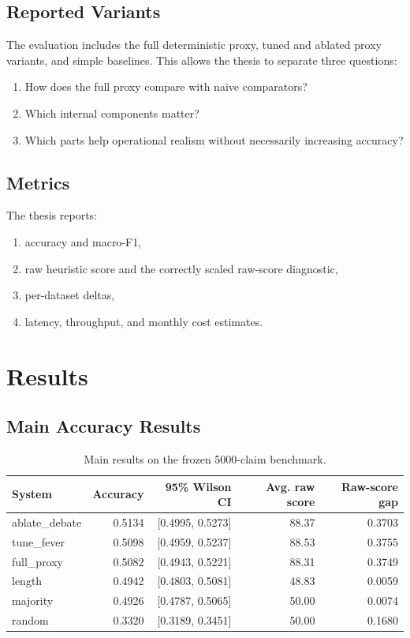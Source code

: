 \documentclass[12pt,a4paper,openright]{report}
\begin{document}
\section{Reported Variants}

The evaluation includes the full deterministic proxy, tuned and ablated proxy variants, and simple baselines. This allows the thesis to separate three questions:

\begin{enumerate}
  \item How does the full proxy compare with naive comparators?
  \item Which internal components matter?
  \item Which parts help operational realism without necessarily increasing accuracy?
\end{enumerate}

\section{Metrics}

The thesis reports:

\begin{enumerate}
  \item accuracy and macro-F1,
  \item raw heuristic score and the correctly scaled raw-score diagnostic,
  \item per-dataset deltas,
  \item latency, throughput, and monthly cost estimates.
\end{enumerate}

\chapter{Results}

\section{Main Accuracy Results}

\begin{table}[H]
\centering
\caption{Main results on the frozen 5000-claim benchmark.}
\begin{tabular}{lrrrr}
\toprule
System & Accuracy & 95\% Wilson CI & Avg. raw score & Raw-score gap \\
\midrule
ablate\_debate & 0.5134 & [0.4995, 0.5273] & 88.37 & 0.3703 \\
tune\_fever & 0.5098 & [0.4959, 0.5237] & 88.53 & 0.3755 \\
full\_proxy & 0.5082 & [0.4943, 0.5221] & 88.31 & 0.3749 \\
length & 0.4942 & [0.4803, 0.5081] & 48.83 & 0.0059 \\
majority & 0.4926 & [0.4787, 0.5065] & 50.00 & 0.0074 \\
random & 0.3320 & [0.3189, 0.3451] & 50.00 & 0.1680 \\
\bottomrule
\end{tabular}
\end{table}
\end{document}
